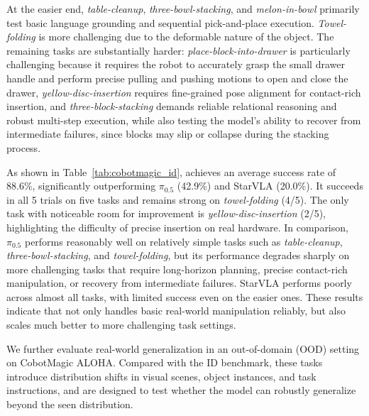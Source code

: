 At the easier end, \textit{table-cleanup}, \textit{three-bowl-stacking}, and \textit{melon-in-bowl} primarily test basic language grounding and sequential pick-and-place execution. \textit{Towel-folding} is more challenging due to the deformable nature of the object. The remaining tasks are substantially harder: \textit{place-block-into-drawer} is particularly challenging because it requires the robot to accurately grasp the small drawer handle and perform precise pulling and pushing motions to open and close the drawer, \textit{yellow-disc-insertion} requires fine-grained pose alignment for contact-rich insertion, and \textit{three-block-stacking} demands reliable relational reasoning and robust multi-step execution, while also testing the model's ability to recover from intermediate failures, since blocks may slip or collapse during the stacking process.

As shown in Table~\ref{tab:cobotmagic_id}, \ours achieves an average success rate of 88.6\%, significantly outperforming $\pi_{0.5}$ (42.9\%) and StarVLA (20.0\%). It succeeds in all 5 trials on five tasks and remains strong on \textit{towel-folding} (4/5). The only task with noticeable room for improvement is \textit{yellow-disc-insertion} (2/5), highlighting the difficulty of precise insertion on real hardware. In comparison, $\pi_{0.5}$ performs reasonably well on relatively simple tasks such as \textit{table-cleanup}, \textit{three-bowl-stacking}, and \textit{towel-folding}, but its performance degrades sharply on more challenging tasks that require long-horizon planning, precise contact-rich manipulation, or recovery from intermediate failures. StarVLA performs poorly across almost all tasks, with limited success even on the easier ones. These results indicate that \ours not only handles basic real-world manipulation reliably, but also scales much better to more challenging task settings.

We further evaluate real-world generalization in an out-of-domain (OOD) setting on CobotMagic ALOHA. Compared with the ID benchmark, these tasks introduce distribution shifts in visual scenes, object instances, and task instructions, and are designed to test whether the model can robustly generalize beyond the seen distribution.

